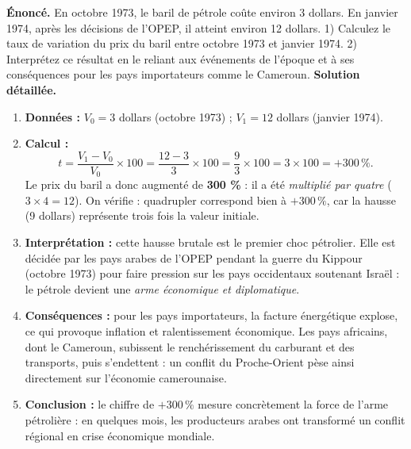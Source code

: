\documentclass[11pt]{article}
\newcommand{\cle}[1]{{\popxbold\color{popdark}#1}}
\begin{document}
\begin{exoresolu}
\textbf{Énoncé.} En octobre 1973, le baril de pétrole coûte environ 3 dollars. En janvier 1974, après les décisions de l'OPEP, il atteint environ 12 dollars. 1) Calculez le taux de variation du prix du baril entre octobre 1973 et janvier 1974. 2) Interprétez ce résultat en le reliant aux événements de l'époque et à ses conséquences pour les pays importateurs comme le Cameroun.
\tcblower
\textbf{Solution détaillée.}
\begin{enumerate}
\item \textbf{Données :} $V_0 = 3$ dollars (octobre 1973) ; $V_1 = 12$ dollars (janvier 1974).
\item \textbf{Calcul :}
\[ t = \frac{V_1 - V_0}{V_0} \times 100 = \frac{12 - 3}{3} \times 100 = \frac{9}{3} \times 100 = 3 \times 100 = +300\,\%. \]
Le prix du baril a donc augmenté de \textbf{300 \%} : il a été \emph{multiplié par quatre} ($3 \times 4 = 12$). On vérifie : quadrupler correspond bien à $+300\,\%$, car la hausse (9 dollars) représente trois fois la valeur initiale.
\item \textbf{Interprétation :} cette hausse brutale est le \cle{premier choc pétrolier}. Elle est décidée par les pays arabes de l'OPEP pendant la guerre du Kippour (octobre 1973) pour faire pression sur les pays occidentaux soutenant Israël : le pétrole devient une \emph{arme économique et diplomatique}.
\item \textbf{Conséquences :} pour les pays importateurs, la facture énergétique explose, ce qui provoque inflation et ralentissement économique. Les pays africains, dont le Cameroun, subissent le renchérissement du carburant et des transports, puis s'endettent : un conflit du Proche-Orient pèse ainsi directement sur l'économie camerounaise.
\item \textbf{Conclusion :} le chiffre de $+300\,\%$ mesure concrètement la force de l'arme pétrolière : en quelques mois, les producteurs arabes ont transformé un conflit régional en crise économique mondiale.
\end{enumerate}
\end{exoresolu}
\end{document}
